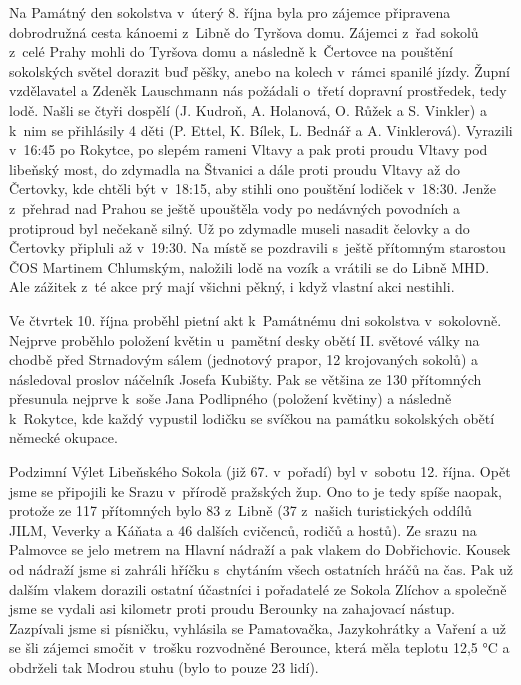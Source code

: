\documentclass[11pt]{article}
\begin{document}
Na Památný den sokolstva v~úterý 8. října byla pro zájemce připravena dobrodružná cesta kánoemi z~Libně do Tyršova domu. Zájemci z~řad sokolů z~celé Prahy mohli do Tyršova domu a následně k~Čertovce na pouštění sokolských světel dorazit buď pěšky, anebo na kolech v~rámci spanilé jízdy. Župní vzdělavatel a Zdeněk Lauschmann nás požádali o~třetí dopravní prostředek, tedy lodě. Našli se čtyři dospělí (J. Kudroň, A. Holanová, O. Růžek a S. Vinkler) a k~nim se přihlásily 4 děti (P. Ettel, K. Bílek, L. Bednář a A. Vinklerová). 
Vyrazili v~16:45 po Rokytce, po slepém rameni Vltavy a pak proti proudu Vltavy pod libeňský most, do zdymadla na Štvanici a dále proti proudu Vltavy až do Čertovky, kde chtěli být v~18:15, aby stihli ono pouštění lodiček v~18:30. Jenže z~přehrad nad Prahou se ještě upouštěla vody po nedávných povodních a protiproud byl nečekaně silný. Už po zdymadle museli nasadit čelovky a do Čertovky připluli až v~19:30. Na místě se pozdravili s~ještě přítomným starostou ČOS Martinem Chlumským, naložili lodě na vozík a vrátili se do Libně MHD. Ale zážitek z~té akce prý mají všichni pěkný, i když vlastní akci nestihli. 

Ve čtvrtek 10. října proběhl pietní akt k~Památnému dni sokolstva v~sokolovně. Nejprve proběhlo položení květin u~pamětní desky obětí II. světové války na chodbě před Strnadovým sálem (jednotový prapor, 12 krojovaných sokolů) a následoval proslov náčelník Josefa Kubišty. Pak se většina ze 130 přítomných přesunula nejprve k~soše Jana Podlipného (položení květiny) a následně k~Rokytce, kde každý vypustil lodičku se svíčkou na památku sokolských obětí německé okupace.



Podzimní Výlet Libeňského Sokola (již 67. v~pořadí) byl v~sobotu 12. října. Opět jsme se připojili ke Srazu v~přírodě pražských žup. Ono to je tedy spíše naopak, protože ze 117 přítomných bylo 83 z~Libně (37 z~našich turistických oddílů JILM, Veverky a Káňata a 46 dalších cvičenců, rodičů a hostů). Ze srazu na Palmovce se jelo metrem na Hlavní nádraží a pak vlakem do Dobřichovic. Kousek od nádraží jsme si zahráli hříčku s~chytáním všech ostatních hráčů na čas. Pak už dalším vlakem dorazili ostatní účastníci i pořadatelé ze Sokola Zlíchov a společně jsme se vydali asi kilometr proti proudu Berounky na zahajovací nástup. Zazpívali jsme si písničku, vyhlásila se Pamatovačka, Jazykohrátky a Vaření a už se šli zájemci smočit v~trošku rozvodněné Berounce, která měla teplotu 12,5 °C a obdrželi tak Modrou stuhu (bylo to pouze 23 lidí). 
\end{document}
